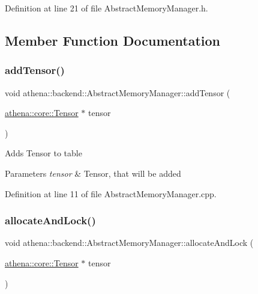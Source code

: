 Definition at line 21 of file Abstract\+Memory\+Manager.\+h.



\subsection{Member Function Documentation}
\mbox{\label{classathena_1_1backend_1_1_abstract_memory_manager_adaa80b617f6f3f19ba5b1ddd2b0377e7}} 
\subsubsection{\texorpdfstring{add\+Tensor()}{addTensor()}}
{\footnotesize\ttfamily void athena\+::backend\+::\+Abstract\+Memory\+Manager\+::add\+Tensor (\begin{DoxyParamCaption}\item[{\mbox{\hyperlink{classathena_1_1core_1_1_tensor}{athena\+::core\+::\+Tensor}} $\ast$}]{tensor }\end{DoxyParamCaption})}

Adds Tensor to table 
\begin{DoxyParams}{Parameters}
{\em tensor} & Tensor, that will be added \\
\hline
\end{DoxyParams}


Definition at line 11 of file Abstract\+Memory\+Manager.\+cpp.

\mbox{\label{classathena_1_1backend_1_1_abstract_memory_manager_ad40a653a8b32410956ba835ca1bb3e5f}} 
\subsubsection{\texorpdfstring{allocate\+And\+Lock()}{allocateAndLock()}\hspace{0.1cm}{\footnotesize\ttfamily [1/3]}}
{\footnotesize\ttfamily void athena\+::backend\+::\+Abstract\+Memory\+Manager\+::allocate\+And\+Lock (\begin{DoxyParamCaption}\item[{\mbox{\hyperlink{classathena_1_1core_1_1_tensor}{athena\+::core\+::\+Tensor}} $\ast$}]{tensor }\end{DoxyParamCaption})}

